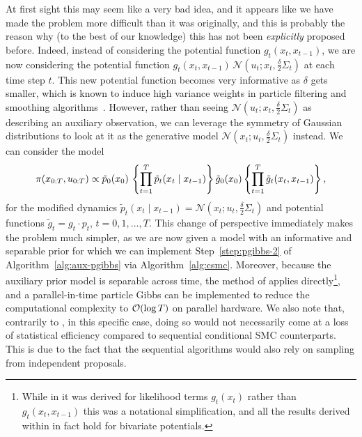 At first sight this may seem like a very bad idea, and it appears like we have made the problem more difficult than it was originally, and this is probably the reason why (to the best of our knowledge) this has not been \emph{explicitly} proposed before.
Indeed, instead of considering the potential function $g_t(x_t, x_{t-1})$, we are now considering the potential function $g_t(x_t, x_{t-1}) \, \mathcal{N}\left(u_t; x_t, \frac{\delta}{2} \Sigma_t\right)$ at each time step $t$. This new potential function becomes very informative as $\delta$ gets smaller, which is known to induce high variance weights in particle filtering and smoothing algorithms~\citep[see, e.g.][Section 10.3.1]{Chopin2020book}. However, rather than seeing $\mathcal{N}\left(u_t; x_t, \frac{\delta}{2} \Sigma_t\right)$ as describing an auxiliary observation, we can leverage the symmetry of Gaussian distributions to look at it as the generative model $\mathcal{N}\left(x_t; u_t, \frac{\delta}{2} \Sigma_t\right)$ instead. We can consider the model
\begin{equation}
    \label{eq:modified-auxiliary-feynman-kac}
    \pi(x_{0:T}, u_{0:T})
    \propto \tilde{p}_0(x_0)\, \left\{\prod_{t=1}^T \tilde{p}_t(x_t \mid x_{t-1})\right\}\tilde{g}_0(x_0) \left\{\prod_{t=1}^T \tilde{g}_t(x_t, x_{t-1}) \right\},
\end{equation}
for the modified dynamics $\tilde{p}_t(x_t \mid x_{t-1}) = \mathcal{N}\left(x_t; u_t, \frac{\delta}{2} \Sigma_t\right)$ and potential functions $\tilde{g}_t = g_t \cdot p_t$, $t=0, 1, \ldots, T$.
This change of perspective immediately makes the problem much simpler, as we are now given a model with an informative and separable prior for which we can implement Step~\ref{step:pgibbs-2} of Algorithm~\ref{alg:aux-pgibbs} via Algorithm~\ref{alg:csmc}.
Moreover, because the auxiliary prior model is separable across time, the method of \citet{corenflos2022sequentialized} applies directly\footnote{While in \citet{corenflos2022sequentialized} it was derived for likelihood terms $g_t(x_t)$ rather than $g_t(x_t, x_{t-1})$ this was a notational simplification, and all the results derived within in fact hold for bivariate potentials.}, and a parallel-in-time particle Gibbs can be implemented to reduce the computational complexity to $\mathcal{O}(\log T)$ on parallel hardware. We also note that, contrarily to \citet[][Section 5.2]{corenflos2022sequentialized}, in this specific case, doing so would not necessarily come at a loss of statistical efficiency compared to sequential conditional SMC counterparts. This is due to the fact that the sequential algorithms would also rely on sampling from independent proposals.

